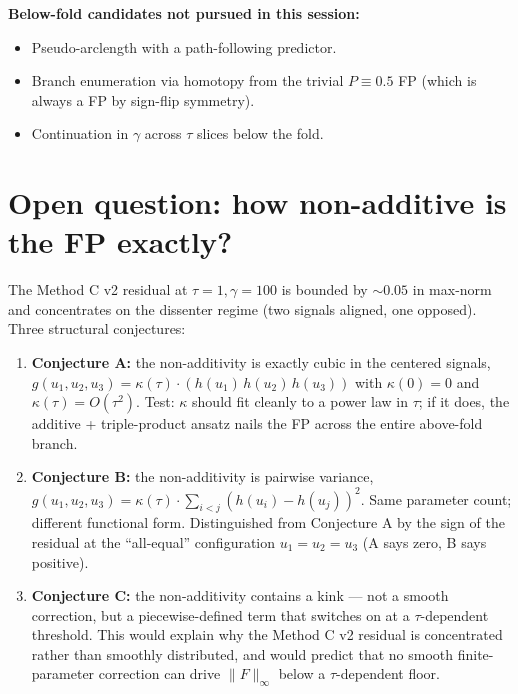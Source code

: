 \documentclass[11pt]{article}
\begin{document}
\textbf{Below-fold candidates not pursued in this session:}
\begin{itemize}\itemsep1pt
  \item Pseudo-arclength with a path-following predictor.
  \item Branch enumeration via homotopy from the trivial $P \equiv 0.5$
        FP (which is always a FP by sign-flip symmetry).
  \item Continuation in $\gamma$ across $\tau$ slices below the fold.
\end{itemize}

\section{Open question: how non-additive is the FP exactly?}

The Method C v2 residual at $\tau = 1, \gamma = 100$ is bounded by
$\sim 0.05$ in max-norm and concentrates on the dissenter regime
(two signals aligned, one opposed). Three structural conjectures:

\begin{enumerate}\itemsep1pt
  \item \textbf{Conjecture A:} the non-additivity is exactly cubic in
        the centered signals,
        $g(u_1,u_2,u_3) = \kappa(\tau) \cdot (h(u_1)\, h(u_2)\, h(u_3))$
        with $\kappa(0) = 0$ and $\kappa(\tau) = O(\tau^2)$. Test:
        $\kappa$ should fit cleanly to a power law in $\tau$; if it
        does, the additive + triple-product ansatz nails the FP
        across the entire above-fold branch.
  \item \textbf{Conjecture B:} the non-additivity is pairwise
        variance,
        $g(u_1,u_2,u_3) = \kappa(\tau) \cdot \sum_{i<j} (h(u_i) - h(u_j))^2$.
        Same parameter count; different functional form. Distinguished
        from Conjecture A by the sign of the residual at the
        ``all-equal'' configuration $u_1 = u_2 = u_3$ (A says zero, B
        says positive).
  \item \textbf{Conjecture C:} the non-additivity contains a kink
        --- not a smooth correction, but a piecewise-defined term that
        switches on at a $\tau$-dependent threshold. This would
        explain why the Method C v2 residual is concentrated rather
        than smoothly distributed, and would predict that no smooth
        finite-parameter correction can drive $\|F\|_\infty$ below a
        $\tau$-dependent floor.
\end{enumerate}
\end{document}
